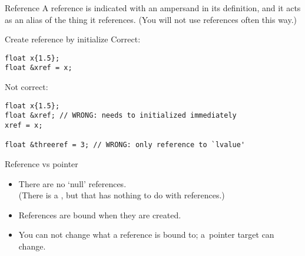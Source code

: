 \begin{plainblock}{Reference}
  \label{sl:cpp-reference}
  A reference is indicated with an ampersand in its definition, and it
  acts as an alias of the thing it references.
  (You will not use references often this way.)
\end{plainblock}

\begin{block}{Create reference by initialize}
  \label{sl:cpp-ref-define}
  Correct:
\begin{lstlisting}
float x{1.5};
float &xref = x;
\end{lstlisting}
Not correct:
\begin{lstlisting}
float x{1.5};
float &xref; // WRONG: needs to initialized immediately
xref = x;

float &threeref = 3; // WRONG: only reference to `lvalue'
\end{lstlisting}
\end{block}

\begin{comment}
  \begin{advanced}
    If you already know about pointers, you may wonder about the similarities.
    \begin{itemize}
    \item There are no `null' references. There is a \indexc{nullptr}.
    \item References are bound when they are created.
    \item You can not change what a reference is bound to;
      the pointer target can change.
    \item Reference syntax is cleaner.
    \item Pointer use has implications about ownership: use only for specific purposes.
    \end{itemize}
  \end{advanced}
\end{comment}

\begin{slide}{Reference vs pointer}
  \label{sl:ref-vs-ptr}
  \begin{itemize}
  \item There are no `null' references.\\
    (There is a , but that has nothing to do with references.)
  \item References are bound when they are created.
  \item You can not change what a reference is bound to;\slidebreak
    a~pointer target can change.
  \end{itemize}
\end{slide}

